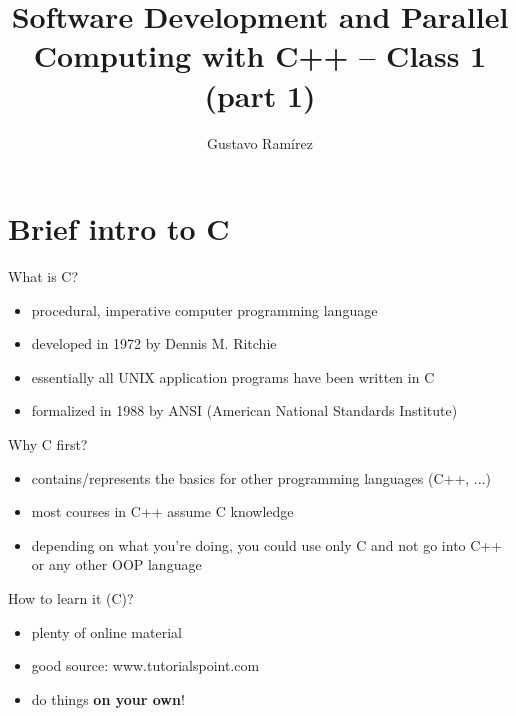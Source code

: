\documentclass[10pt]{beamer}
\title{Software Development and Parallel Computing with C++ -- Class 1 (part 1)}
\date{}
\author{Gustavo Ram{\'i}rez}
\begin{document}
\maketitle




\section{Brief intro to C}


\begin{frame}[fragile]{What is C?}
\begin{itemize}
\item procedural, imperative computer programming language
\item developed in 1972 by Dennis M. Ritchie
\item essentially all UNIX application programs have been written in C
\item formalized in 1988 by ANSI (American National Standards Institute)
\end{itemize}
\end{frame}


\begin{frame}[fragile]{Why C first?}
\begin{itemize}
\item contains/represents the basics for other programming languages (C++, ...)
\item most courses in C++ assume C knowledge
\item depending on what you're doing, you could use only C and not go into C++ or any other OOP language
\end{itemize}
\end{frame}



\begin{frame}[fragile]{How to learn it (C)?}
\begin{itemize}
\item plenty of online material
\item good source: www.tutorialspoint.com
\item do things \textbf{on your own}!
\end{itemize}
\end{frame}
\end{document}
